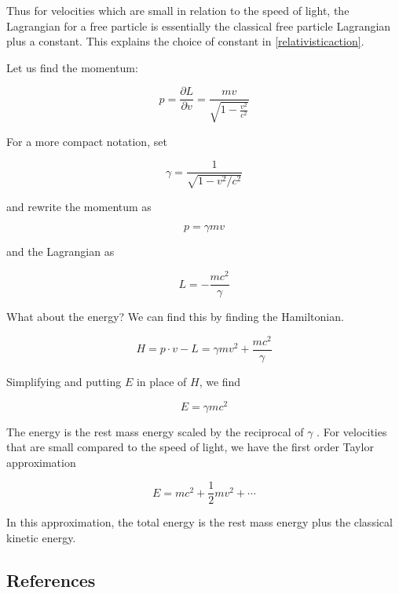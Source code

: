 Thus for velocities which are small in relation to the speed of light, the Lagrangian for a free particle is essentially the classical free particle Lagrangian plus a constant.  This explains the choice of constant in \eqref{relativisticaction}.

Let us find the momentum:

\begin{equation}
p = \frac{\partial L}{\partial v} = \frac{mv}{\sqrt{1 - \frac{ v^2}{ c^2}}}
\end{equation}

For a more compact notation, set

\begin{equation}
\gamma = \frac{1}{\sqrt{1 - v^2 /c^2}}
\end{equation}

and rewrite the momentum as

\begin{equation}
 p = \gamma mv
\end{equation}

and the Lagrangian as

\begin{equation}
L = - \frac{mc^2}{\gamma}
\end{equation}


What about the energy?  We can find this by finding the Hamiltonian.

\begin{equation}
H = p\cdot v - L = \gamma mv^2 +   \frac{mc^2 }{\gamma}
\end{equation}

Simplifying and putting $E$ in place of $H$, we find

\begin{equation}
E = \gamma m c^2
\end{equation}

The energy is the rest mass energy scaled by the reciprocal of $\gamma$ . For velocities that are small compared to the speed of light, we have the first order Taylor approximation

\begin{equation}
E = mc^2 + \frac{1}{2}mv^2 + \cdots
\end{equation}

In this approximation, the total energy is the rest mass energy plus the classical kinetic energy.


\subsection{References}

